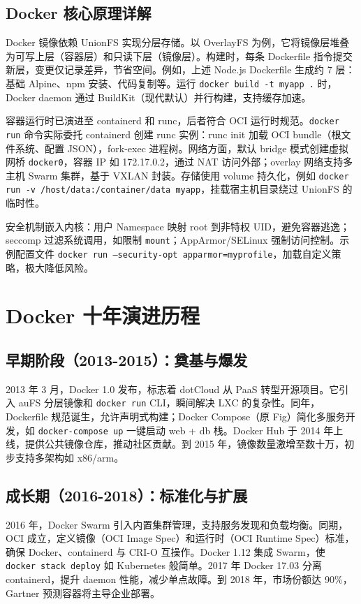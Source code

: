 \section{Docker 核心原理详解}
Docker 镜像依赖 UnionFS 实现分层存储。以 OverlayFS 为例，它将镜像层堆叠为可写上层（容器层）和只读下层（镜像层）。构建时，每条 Dockerfile 指令提交新层，变更仅记录差异，节省空间。例如，上述 Node.js Dockerfile 生成约 7 层：基础 Alpine、npm 安装、代码复制等。运行 \texttt{docker build -t myapp .} 时，Docker daemon 通过 BuildKit（现代默认）并行构建，支持缓存加速。\par
容器运行时已演进至 containerd 和 runc，后者符合 OCI 运行时规范。\texttt{docker run} 命令实际委托 containerd 创建 runc 实例：runc init 加载 OCI bundle（根文件系统、配置 JSON），fork-exec 进程树。网络方面，默认 bridge 模式创建虚拟网桥 \texttt{docker0}，容器 IP 如 172.17.0.2，通过 NAT 访问外部；overlay 网络支持多主机 Swarm 集群，基于 VXLAN 封装。存储使用 volume 持久化，例如 \texttt{docker run -v /host/data:/container/data myapp}，挂载宿主机目录绕过 UnionFS 的临时性。\par
安全机制嵌入内核：用户 Namespace 映射 root 到非特权 UID，避免容器逃逸；seccomp 过滤系统调用，如限制 \texttt{mount}；AppArmor/SELinux 强制访问控制。示例配置文件 \texttt{docker run --security-opt apparmor=myprofile}，加载自定义策略，极大降低风险。\par
\chapter{Docker 十年演进历程}
\section{早期阶段（2013-2015）：奠基与爆发}
2013 年 3 月，Docker 1.0 发布，标志着 dotCloud 从 PaaS 转型开源项目。它引入 auFS 分层镜像和 \texttt{docker run} CLI，瞬间解决 LXC 的复杂性。同年，Dockerfile 规范诞生，允许声明式构建；Docker Compose（原 Fig）简化多服务开发，如 \texttt{docker-compose up} 一键启动 web + db 栈。Docker Hub 于 2014 年上线，提供公共镜像仓库，推动社区贡献。到 2015 年，镜像数量激增至数十万，初步支持多架构如 x86/arm。\par
\section{成长期（2016-2018）：标准化与扩展}
2016 年，Docker Swarm 引入内置集群管理，支持服务发现和负载均衡。同期，OCI 成立，定义镜像（OCI Image Spec）和运行时（OCI Runtime Spec）标准，确保 Docker、containerd 与 CRI-O 互操作。Docker 1.12 集成 Swarm，使 \texttt{docker stack deploy} 如 Kubernetes 般简单。2017 年 Docker 17.03 分离 containerd，提升 daemon 性能，减少单点故障。到 2018 年，市场份额达 90\%{}，Gartner 预测容器将主导企业部署。\par
